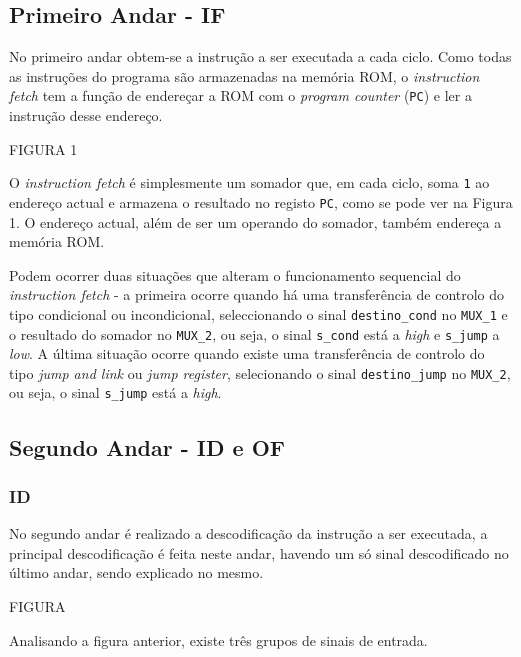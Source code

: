 \documentclass[11pt]{article}
\numberwithin{equation}{section}
\begin{document}
\subsection{Primeiro Andar - IF}

No primeiro andar obtem-se a instrução a ser executada a cada ciclo. Como todas as instruções do programa são armazenadas na memória ROM, o \textit{instruction fetch} tem a função de endereçar a ROM com o \textit{program counter} (\texttt{PC}) e ler a instrução desse endereço.

FIGURA 1

O \textit{instruction fetch} é simplesmente um somador que, em cada ciclo, soma \texttt{1} ao endereço actual e armazena o resultado no registo \texttt{PC}, como se pode ver na Figura 1. O endereço actual, além de ser um operando do somador, também endereça a memória ROM.

Podem ocorrer duas situações que alteram o funcionamento sequencial do \textit{instruction fetch} - a primeira ocorre quando há uma transferência de controlo do tipo condicional ou incondicional, seleccionando o sinal \texttt{destino\_cond} no \texttt{MUX\_1} e o resultado do somador no \texttt{MUX\_2}, ou seja, o sinal \texttt{s\_cond} está a \textit{high} e \texttt{s\_jump} a \textit{low}. A última situação ocorre quando existe uma transferência de controlo do tipo \textit{jump and link} ou \textit{jump register}, selecionando o sinal \texttt{destino\_jump} no \texttt{MUX\_2}, ou seja, o sinal \texttt{s\_jump} está a \textit{high}.



\subsection{Segundo Andar - ID e OF}

\subsubsection{ID}

No segundo andar é realizado a descodificação da instrução a ser executada, a principal descodificação é feita neste andar, havendo um só sinal descodificado no último andar, sendo explicado no mesmo.

FIGURA

Analisando a figura anterior, existe três grupos de sinais de entrada.

\vspace{-2mm}
\end{document}
